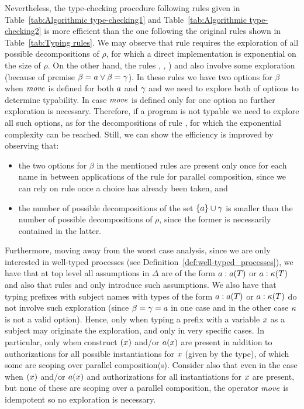 Nevertheless, the type-checking procedure following rules given in Table~\ref{tab:Algorithmic type-checking1} and Table~\ref{tab:Algorithmic type-checking2} is  more efficient than the one following the original rules shown in Table~\ref{tab:Typing rules}. We may observe that rule  requires the exploration of all possible decompositions of $\rho$, for which a direct implementation is exponential on the size of $\rho$. On the other hand, the rules , , ) and  also involve some exploration (because of premise $\beta=a \vee \beta=\gamma$). In these rules we have two options for $\beta$ when $\mathit{move}$ is defined for both $a$ and $\gamma$ and we need to explore both of options to determine typability. In case $\mathit{move}$ is defined only for one option no further exploration is necessary. 
Therefore, if a program is not typable we need to explore all such options, as for the decompositions of rule , for which the exponential complexity can be reached. Still, we can show the efficiency is improved by observing that: 
\begin{itemize}
\item the two options for $\beta$ in the mentioned rules are present only once for each name in between applications of the rule for parallel composition, since we can rely on rule  once a choice has already been taken, and 
\item  the number of possible decompositions of the set $\{a\}\cup \gamma$ is smaller than the number of possible decompositions of $\rho$, since the former is necessarily contained in the latter. 
\end{itemize} 

Furthermore, moving away from the worst case analysis, since we are only interested in well-typed processes (see Definition~\ref{def:well-typed_processes}), we have that at top level all assumptions in $\Delta$ are of the form $a:a(T)$ or $a:{\mathbf{\kappa}}(T)$ and also that rules  and  only introduce such assumptions. We also have that typing prefixes with subject names with types of the form $a:a(T)$ or $a:{\mathbf{\kappa}}(T)$ do not involve such exploration (since $\beta = \gamma = a$ in one case and in the other case ${\mathbf{\kappa}}$ is not a valid option).
Hence, only when typing a prefix with a variable $x$ as a subject may originate the exploration, and only in very specific cases. In particular, only when construct $(x)$ and/or $a(x)$ are present in addition to authorizations for all possible instantiations for $x$ (given by the type), of which some are scoping over parallel composition(s). Consider also that even in the case when $(x)$ and/or $a(x)$ and authorizations for all instantiations for $x$ are present, but none of these are scoping over a parallel composition, the operator $\mathit{move}$ is idempotent so no exploration is necessary.




